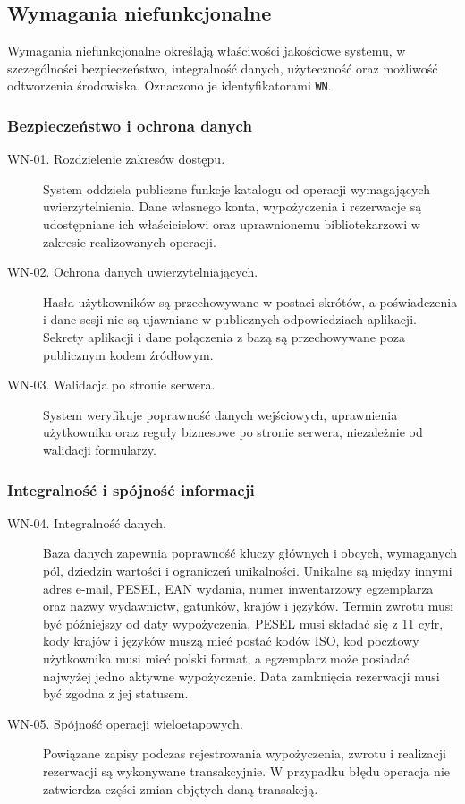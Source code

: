 \documentclass[11pt, a4paper]{article}
\begin{document}
\subsection{Wymagania niefunkcjonalne}
\label{subsec:wymagania-niefunkcjonalne}

Wymagania niefunkcjonalne określają właściwości jakościowe systemu, w szczególności bezpieczeństwo, integralność danych, użyteczność oraz możliwość odtworzenia środowiska. Oznaczono je identyfikatorami \texttt{WN}.

\subsubsection{Bezpieczeństwo i ochrona danych}

\begin{description}
\item[WN-01. Rozdzielenie zakresów dostępu.] System oddziela publiczne funkcje katalogu od operacji wymagających uwierzytelnienia. Dane własnego konta, wypożyczenia i rezerwacje są udostępniane ich właścicielowi oraz uprawnionemu bibliotekarzowi w zakresie realizowanych operacji.
\item[WN-02. Ochrona danych uwierzytelniających.] Hasła użytkowników są przechowywane w postaci skrótów, a poświadczenia i dane sesji nie są ujawniane w publicznych odpowiedziach aplikacji. Sekrety aplikacji i dane połączenia z bazą są przechowywane poza publicznym kodem źródłowym.
\item[WN-03. Walidacja po stronie serwera.] System weryfikuje poprawność danych wejściowych, uprawnienia użytkownika oraz reguły biznesowe po stronie serwera, niezależnie od walidacji formularzy.
\end{description}

\subsubsection{Integralność i spójność informacji}

\begin{description}
\item[WN-04. Integralność danych.] Baza danych zapewnia poprawność kluczy głównych i obcych, wymaganych pól, dziedzin wartości i ograniczeń unikalności. Unikalne są między innymi adres e-mail, PESEL, EAN wydania, numer inwentarzowy egzemplarza oraz nazwy wydawnictw, gatunków, krajów i języków. Termin zwrotu musi być późniejszy od daty wypożyczenia, PESEL musi składać się z 11 cyfr, kody krajów i języków muszą mieć postać kodów ISO, kod pocztowy użytkownika musi mieć polski format, a egzemplarz może posiadać najwyżej jedno aktywne wypożyczenie. Data zamknięcia rezerwacji musi być zgodna z jej statusem.
\item[WN-05. Spójność operacji wieloetapowych.] Powiązane zapisy podczas rejestrowania wypożyczenia, zwrotu i realizacji rezerwacji są wykonywane transakcyjnie. W przypadku błędu operacja nie zatwierdza części zmian objętych daną transakcją.
\end{description}
\end{document}
